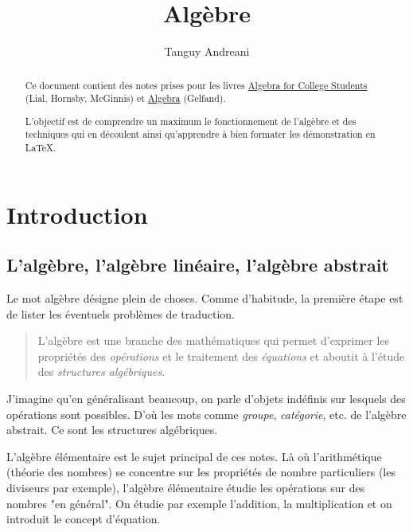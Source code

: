 \documentclass[fleqn,a4paper,nobib]{tufte-handout}
\title{Algèbre}
\author{Tanguy Andreani}
\begin{document}
\maketitle

\begin{abstract}
    Ce document contient des notes prises pour les livres
    \underline{Algebra for College Students} (Lial, Hornsby, McGinnis)
    et \underline{Algebra} (Gelfand).
    
    L'objectif est de comprendre un maximum le fonctionnement
    de l'algèbre et des techniques qui en découlent ainsi
    qu'apprendre à bien formater les démonstration en \LaTeX.
\end{abstract}

\tableofcontents

\section{Introduction}

\subsection{L'algèbre, l'algèbre linéaire, l'algèbre abstrait}



Le mot algèbre désigne plein de choses. Comme d'habitude, la
première étape est de lister les éventuels problèmes de traduction.

\begin{quote}
    L'algèbre est une branche des mathématiques qui permet d'exprimer les
    propriétés des \textit{opérations} et le traitement des \textit{équations}
    et aboutit à l'étude des \textit{structures algébriques}.
\end{quote}

J'imagine qu'en généralisant beaucoup, on parle d'objets indéfinis
sur lesquels des opérations sont possibles. D'où les mots comme
\textit{groupe}, \textit{catégorie}, etc. de l'algèbre abstrait.
Ce sont les structures algébriques.

L'algèbre élémentaire est le sujet principal de ces notes.
Là où l'arithmétique (théorie des nombres) se concentre sur les
propriétés de nombre particuliers (les diviseurs par exemple),
l'algèbre élémentaire étudie les opérations sur des nombres "en général".
On étudie par exemple l'addition, la multiplication et
on introduit le concept d'équation.
\end{document}

